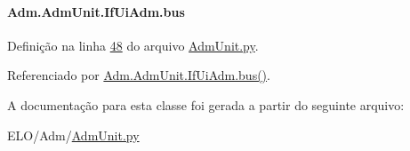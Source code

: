 \paragraph[{bus}]{\setlength{\rightskip}{0pt plus 5cm}Adm.\+Adm\+Unit.\+If\+Ui\+Adm.\+bus}\label{classAdm_1_1AdmUnit_1_1IfUiAdm_a604bb1c41014e85eee44db64a79a7fcc}


Definição na linha \hyperlink{AdmUnit_8py_source_l00048}{48} do arquivo \hyperlink{AdmUnit_8py_source}{Adm\+Unit.\+py}.



Referenciado por \hyperlink{classAdm_1_1AdmUnit_1_1IfUiAdm_a6846282d9a13a62cfe54639b6ee121f8}{Adm.\+Adm\+Unit.\+If\+Ui\+Adm.\+bus()}.



A documentação para esta classe foi gerada a partir do seguinte arquivo\+:\begin{DoxyCompactItemize}
\item 
E\+L\+O/\+Adm/\hyperlink{AdmUnit_8py}{Adm\+Unit.\+py}\end{DoxyCompactItemize}
